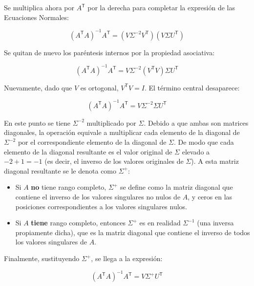 \documentclass[11pt,a4paper]{article}
\newcommand{\trans}{\mathsf{T}}      %
\begin{document}
Se multiplica ahora por \(A^{\trans}\) por la derecha para completar la expresión de las Ecuaciones Normales:

\begin{equation}
    (A^{\trans} A)^{-1} A^{\trans} = (V \Sigma^{-2} V^{\trans}) (V \Sigma U^{\trans})
\end{equation}

Se quitan de nuevo los paréntesis internos por la propiedad asociativa:

\begin{equation}
    (A^{\trans} A)^{-1} A^{\trans} = V \Sigma^{-2} (V^{\trans} V) \Sigma U^{\trans}
\end{equation}

Nuevamente, dado que \(V\) es ortogonal, \(V^{\trans} V = I\). El término central desaparece:

\begin{equation}
    (A^{\trans} A)^{-1} A^{\trans} = V \Sigma^{-2} \Sigma U^{\trans}
\end{equation}

En este punto se tiene \(\Sigma^{-2}\) multiplicado por \(\Sigma\). Debido a que ambas son matrices diagonales, la operación equivale a multiplicar cada elemento de la diagonal de \(\Sigma^{-2}\) por el correspondiente elemento de la diagonal de \(\Sigma\). De modo que cada elemento de la diagonal resultante es el valor original de \(\Sigma\) elevado a \(-2 + 1 = -1\) (es decir, el inverso de los valores originales de \(\Sigma\)). A esta matriz diagonal resultante se le denota como \(\Sigma^+\):

\begin{itemize}
    \item Si \(A\) \textbf{no} tiene rango completo, \(\Sigma^+\) se define como la matriz diagonal que contiene el inverso de los valores singulares no nulos de \(A\), y ceros en las posiciones correspondientes a los valores singulares nulos.
    \item Si \(A\) \textbf{tiene} rango completo, entonces \(\Sigma^+\) es en realidad \(\Sigma^{-1}\) (una inversa propiamente dicha), que es la matriz diagonal que contiene el inverso de todos los valores singulares de \(A\).
\end{itemize}

Finalmente, sustituyendo \(\Sigma^+\), se llega a la expresión:

\begin{equation}
    (A^{\trans} A)^{-1} A^{\trans} = V \Sigma^+ U^{\trans}
\end{equation}
\end{document}
